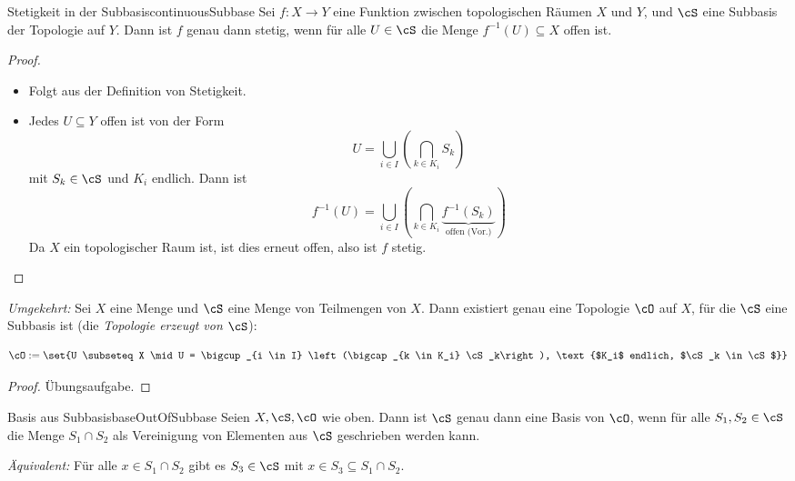 \documentclass[language=ngerman]{TemplateLecture} %
\begin{document}
\begin{lem}{Stetigkeit in der Subbasis}{continuousSubbase}
    Sei $f: X \to Y$ eine Funktion zwischen topologischen Räumen $X$ und $Y$, und $\cS$ eine Subbasis der Topologie auf $Y$. Dann ist $f$ genau dann stetig, wenn für alle $U \in \cS$ die Menge $f^{-1}(U) \subseteq X$ offen ist.
\end{lem}

\begin{proof}
    \begin{itemize}
        \item[\enquote{$\Rightarrow$}:] Folgt aus der Definition von Stetigkeit.
        \item[\enquote{$\Leftarrow$}:] Jedes $U \subseteq Y$ offen ist von der Form 
        \begin{equation*}
            U = \bigcup_{i \in I} \left(\bigcap_{k \in K_i} S_k\right)
        \end{equation*}
        mit $S_k \in \cS$ und $K_i$ endlich. Dann ist 
        \begin{equation*}
            f^{-1}(U) = \bigcup_{i \in I}\left(\bigcap_{k \in K_i} \underset{\text{offen (Vor.)}}{\underbrace{f^{-1}(S_k)}}\right)
        \end{equation*}
        Da $X$ ein topologischer Raum ist, ist dies erneut offen, also ist $f$ stetig.
    \end{itemize}
\end{proof}
\emph{Umgekehrt:} Sei $X$ eine Menge und $\cS$ eine Menge von Teilmengen von $X$. Dann existiert genau eine Topologie $\cO$ auf $X$, für die $\cS$ eine Subbasis ist (die \emph{Topologie erzeugt von $\cS$}):

\begin{equation*}
    \cO := \set{U \subseteq X \mid U = \bigcup_{i \in I} \left(\bigcap_{k \in K_i} \cS_k\right), \text{$K_i$ endlich, $\cS_k \in \cS$}}
\end{equation*}
\begin{proof}
    Übungsaufgabe.
\end{proof}

\begin{thm}{Basis aus Subbasis}{baseOutOfSubbase}
    Seien $X, \cS, \cO$ wie oben. Dann ist $\cS$ genau dann eine Basis von $\cO$, wenn für alle $S_1, S_2 \in \cS$ die Menge $S_1 \cap S_2$ als Vereinigung von Elementen aus $\cS$ geschrieben werden kann.

    \textit{Äquivalent:} Für alle $x \in S_1 \cap S_2$ gibt es $S_3 \in \cS$ mit $x \in S_3 \subseteq S_1 \cap S_2$.
\end{thm}
\end{document}
